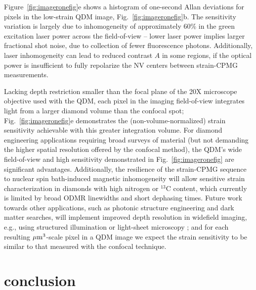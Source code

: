 \documentclass[reprint,superscriptaddress,hyphens,amsmath,amssymb,aps,prx,float]{revtex4-2}
\begin{document}
Figure~\ref{fig:imageronefig}e shows a histogram of one-second Allan deviations for pixels in the low-strain QDM image, Fig.~\ref{fig:imageronefig}b.  The sensitivity variation is largely due to inhomogeneity of approximately 60\% in the green excitation laser power across the field-of-view -- lower laser power implies larger fractional shot noise, due to collection of fewer fluorescence photons.  Additionally, laser inhomogeneity can lead to reduced contrast $A$ in some regions, if the optical power is insufficient to fully repolarize the NV centers between strain-CPMG measurements.

Lacking depth restriction smaller than the focal plane of the 20X microscope objective used with the QDM, each pixel in the imaging field-of-view integrates light from a larger diamond volume than the confocal spot; Fig.~\ref{fig:imageronefig}e demonstrates the (non-volume-normalized) strain sensitivity achievable with this greater integration volume.  For diamond engineering applications requiring broad surveys of material (but not demanding the higher spatial resolution offered by the confocal method), the QDM's wide field-of-view and high sensitivity demonstrated in Fig.~\ref{fig:imageronefig} are significant advantages.  Additionally, the resilience of the strain-CPMG sequence to nuclear spin bath-induced magnetic inhomogeneity will allow sensitive strain characterization in diamonds with high nitrogen or $^{13}$C content, which currently is limited by broad ODMR linewidths and short dephasing times.  Future work towards other applications, such as photonic structure engineering and dark matter searches, will implement improved depth resolution in widefield imaging, e.g., using structured illumination or light-sheet microscopy \cite{MarshallQST2021}; and for each resulting ${\rm \mu m^3}$-scale pixel in a QDM image we expect the strain sensitivity to be similar to that measured with the confocal technique.  

\section{conclusion}
\end{document}
